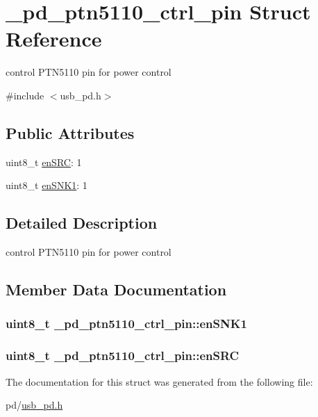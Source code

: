 \hypertarget{struct__pd__ptn5110__ctrl__pin}{\section{\-\_\-pd\-\_\-ptn5110\-\_\-ctrl\-\_\-pin Struct Reference}
\label{struct__pd__ptn5110__ctrl__pin}
}


control P\-T\-N5110 pin for power control  




{\ttfamily \#include $<$usb\-\_\-pd.\-h$>$}

\subsection*{Public Attributes}
\begin{DoxyCompactItemize}
\item 
uint8\-\_\-t \hyperlink{struct__pd__ptn5110__ctrl__pin_ace741c1da1ba78c0e1068f69a4a8f9d5}{en\-S\-R\-C}\-: 1
\item 
uint8\-\_\-t \hyperlink{struct__pd__ptn5110__ctrl__pin_aa46e27b5322119661fe8081a042478f7}{en\-S\-N\-K1}\-: 1
\end{DoxyCompactItemize}


\subsection{Detailed Description}
control P\-T\-N5110 pin for power control 

\subsection{Member Data Documentation}
\hypertarget{struct__pd__ptn5110__ctrl__pin_aa46e27b5322119661fe8081a042478f7}{
\subsubsection[{en\-S\-N\-K1}]{\setlength{\rightskip}{0pt plus 5cm}uint8\-\_\-t \-\_\-pd\-\_\-ptn5110\-\_\-ctrl\-\_\-pin\-::en\-S\-N\-K1}}\label{struct__pd__ptn5110__ctrl__pin_aa46e27b5322119661fe8081a042478f7}
\hypertarget{struct__pd__ptn5110__ctrl__pin_ace741c1da1ba78c0e1068f69a4a8f9d5}{
\subsubsection[{en\-S\-R\-C}]{\setlength{\rightskip}{0pt plus 5cm}uint8\-\_\-t \-\_\-pd\-\_\-ptn5110\-\_\-ctrl\-\_\-pin\-::en\-S\-R\-C}}\label{struct__pd__ptn5110__ctrl__pin_ace741c1da1ba78c0e1068f69a4a8f9d5}


The documentation for this struct was generated from the following file\-:\begin{DoxyCompactItemize}
\item 
pd/\hyperlink{usb__pd_8h}{usb\-\_\-pd.\-h}\end{DoxyCompactItemize}
